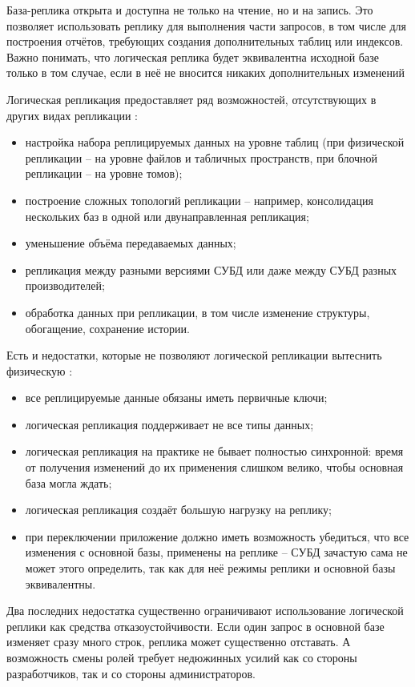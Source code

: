 База-реплика открыта и доступна не только на чтение, но и на запись. Это позволяет использовать реплику для выполнения
части запросов, в том числе для построения отчётов, требующих создания дополнительных таблиц или индексов. Важно
понимать, что логическая реплика будет эквивалентна исходной базе только в том случае, если в неё не вносится никаких
дополнительных изменений

Логическая репликация предоставляет ряд возможностей, отсутствующих в других видах репликации \autocite{PhysLogPeplic}:
\begin{itemize}
    \item настройка набора реплицируемых данных на уровне таблиц (при физической репликации – на уровне файлов и табличных пространств, при блочной репликации – на уровне томов);
    \item построение сложных топологий репликации – например, консолидация нескольких баз в одной или двунаправленная репликация;
    \item уменьшение объёма передаваемых данных;
    \item репликация между разными версиями СУБД или даже между СУБД разных производителей;
    \item обработка данных при репликации, в том числе изменение структуры, обогащение, сохранение истории.
\end{itemize}

Есть и недостатки, которые не позволяют логической репликации вытеснить физическую \autocite{PhysLogPeplic}:
\begin{itemize}
    \item все реплицируемые данные обязаны иметь первичные ключи;
    \item логическая репликация поддерживает не все типы данных;
    \item логическая репликация на практике не бывает полностью синхронной: время от получения изменений до их применения слишком велико, чтобы основная база могла ждать;
    \item логическая репликация создаёт большую нагрузку на реплику;
    \item при переключении приложение должно иметь возможность убедиться, что все изменения с основной базы, применены на реплике – СУБД зачастую сама не может этого определить, так как для неё режимы реплики и основной базы эквивалентны.
\end{itemize}

Два последних недостатка существенно ограничивают использование логической реплики как средства отказоустойчивости. Если
один запрос в основной базе изменяет сразу много строк, реплика может существенно отставать. А возможность смены ролей
требует недюжинных усилий как со стороны разработчиков, так и со стороны администраторов.

